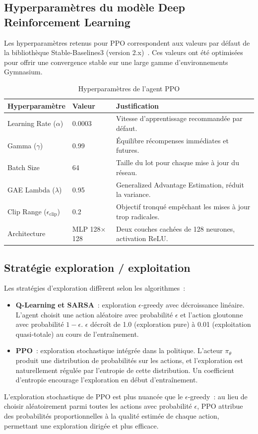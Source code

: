 \documentclass[11pt,a4paper]{report}
\begin{document}
\subsection{Hyperparamètres du modèle Deep Reinforcement Learning}
\label{sec:hp-ppo}
Les hyperparamètres retenus pour PPO correspondent aux valeurs par défaut de la bibliothèque Stable-Baselines3 (version 2.x)~\cite{stable-baselines3}. Ces valeurs ont été optimisées pour offrir une convergence stable sur une large gamme d'environnements Gymnasium.

\begin{table}[H]
\centering
\caption{Hyperparamètres de l'agent PPO}
\label{tab:hyperparametres-ppo}
\begin{tabular}{llp{7cm}}
\toprule
\textbf{Hyperparamètre} & \textbf{Valeur} & \textbf{Justification} \\
\midrule
Learning Rate ($\alpha$) & 0.0003 & Vitesse d'apprentissage recommandée par défaut. \\
Gamma ($\gamma$) & 0.99 & Équilibre récompenses immédiates et futures. \\
Batch Size & 64 & Taille du lot pour chaque mise à jour du réseau. \\
GAE Lambda ($\lambda$) & 0.95 & Generalized Advantage Estimation, réduit la variance. \\
Clip Range ($\epsilon_{\text{clip}}$) & 0.2 & Objectif tronqué empêchant les mises à jour trop radicales. \\
Architecture & MLP 128$\times$128 & Deux couches cachées de 128 neurones, activation ReLU. \\
\bottomrule
\end{tabular}
\end{table}

\subsection{Stratégie exploration / exploitation}
\label{sec:exploration-exploitation}
Les stratégies d'exploration diffèrent selon les algorithmes~:
\begin{itemize}
    \item \textbf{Q-Learning et SARSA}~: exploration $\epsilon$-greedy avec décroissance linéaire. L'agent choisit une action aléatoire avec probabilité $\epsilon$ et l'action gloutonne avec probabilité $1 - \epsilon$. $\epsilon$ décroît de 1.0 (exploration pure) à 0.01 (exploitation quasi-totale) au cours de l'entraînement.
    \item \textbf{PPO}~: exploration stochastique intégrée dans la politique. L'acteur $\pi_\theta$ produit une distribution de probabilités sur les actions, et l'exploration est naturellement régulée par l'entropie de cette distribution. Un coefficient d'entropie encourage l'exploration en début d'entraînement.
\end{itemize}
L'exploration stochastique de PPO est plus nuancée que le $\epsilon$-greedy~: au lieu de choisir aléatoirement parmi toutes les actions avec probabilité $\epsilon$, PPO attribue des probabilités proportionnelles à la qualité estimée de chaque action, permettant une exploration dirigée et plus efficace.
\end{document}

